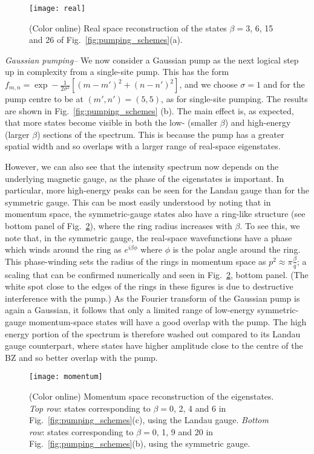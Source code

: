 \documentclass[twocolumn, 10pt, aps, superscriptaddress, floatfix, showpacs, pra, citeautoscript]{revtex4-1}
\begin{document}
\begin{figure}[tb]
  \centering
  \texttt{[image: real]} %
  \caption{(Color online) Real space reconstruction of the states $\beta=3$, 6, 15
    and 26 of Fig.~\ref{fig:pumping_schemes}(a).}
  \label{fig:delta_real_sp}
\end{figure}

{\em{Gaussian pumping--}} We now consider a Gaussian pump as the next logical step up in complexity from a single-site pump. This has the form $f_{m,n} = \exp- \frac{1}{2\sigma^2} \left[(m-m')^2 + (n-n')^2
\right]$, and we choose $\sigma =1$ and for the pump centre to be at $(m',n') = (5,5)$, as for single-site pumping. The results are shown in Fig.~\ref{fig:pumping_schemes} (b). The main effect is, as expected, that more states
become visible in both the low- (smaller $\beta$) and high-energy (larger $\beta$) sections of the spectrum. This is because the pump has a greater spatial width and so overlaps with a larger range of real-space eigenstates. 

However, we can also see that the intensity spectrum now depends on the underlying magnetic gauge, as the phase of the eigenstates is important. In particular, more high-energy peaks can be seen for the Landau gauge than for the symmetric gauge. This can be most easily understood by noting that in momentum space, the symmetric-gauge states also have a ring-like structure (see bottom panel of Fig.~\ref{fig:hom_mom_sp}), where the ring radius increases with $\beta$. To see this, we note that, in the symmetric gauge, the real-space wavefunctions have a phase which
winds around the ring as $e^{i\beta \phi}$ where $\phi$ is the polar angle around the ring. This phase-winding sets the radius of the rings in momentum space as $p^2 \approx \pi \frac{\beta}{q}$; a scaling that can be confirmed numerically and seen in Fig.~\ref{fig:hom_mom_sp}, bottom panel. (The white spot close to the edges of the rings in these figures is due to destructive interference with the pump.)  As the Fourier transform of the Gaussian pump is again a Gaussian, it follows that only a limited range of low-energy symmetric-gauge momentum-space states will have a good overlap with the pump. The high energy portion of the spectrum is therefore washed out compared to its Landau gauge
counterpart, where states have higher amplitude close to the centre of the BZ and so better overlap with the pump. 

\begin{figure}[tb]\centering
  \texttt{[image: momentum]} %
  \caption{(Color online) Momentum space reconstruction of the
    eigenstates. \emph{Top row}: states corresponding to $\beta=0$, 2,
    4 and 6 in Fig.~\ref{fig:pumping_schemes}(c), using the
    Landau gauge.  \emph{Bottom row}: states corresponding to
    $\beta=0$, 1, 9 and 20 in Fig.~\ref{fig:pumping_schemes}(b), using the symmetric gauge.}
  \label{fig:hom_mom_sp}
\end{figure}
\end{document}
